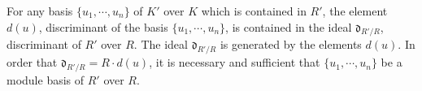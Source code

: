 For any basis $\{u_1, \cdots, u_n\}$ of $K'$ over $K$ which is contained in $R'$, the element $d(u)$, discriminant of the basis $\{u_1, \cdots, u_n\}$, is contained in the ideal $\mathfrak{d}_{R'/R}$, discriminant of $R'$ over $R$. The ideal $\mathfrak{d}_{R'/R}$ is generated by the elements $d(u)$. In order that $\mathfrak{d}_{R'/R} = R \cdot d(u)$, it is necessary and sufficient that $\{u_1, \cdots, u_n\}$ be a module basis of $R'$ over $R$.

